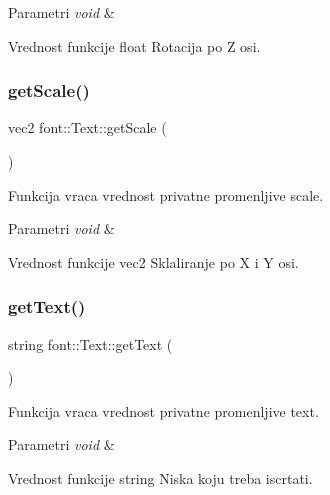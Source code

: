 \begin{DoxyParams}{Parametri}
{\em void} & \\
\hline
\end{DoxyParams}
\begin{DoxyReturn}{Vrednost funkcije}
float Rotacija po Z osi. 
\end{DoxyReturn}
\mbox{\label{classfont_1_1Text_af94e22a422e17028fef39e69b46736f3}} 
\subsubsection{\texorpdfstring{get\+Scale()}{getScale()}}
{\footnotesize\ttfamily vec2 font\+::\+Text\+::get\+Scale (\begin{DoxyParamCaption}{ }\end{DoxyParamCaption})}



Funkcija vraca vrednost privatne promenljive scale. 


\begin{DoxyParams}{Parametri}
{\em void} & \\
\hline
\end{DoxyParams}
\begin{DoxyReturn}{Vrednost funkcije}
vec2 Sklaliranje po X i Y osi. 
\end{DoxyReturn}
\mbox{\label{classfont_1_1Text_ae78670d785e8071d66298c84bcf89330}} 
\subsubsection{\texorpdfstring{get\+Text()}{getText()}}
{\footnotesize\ttfamily string font\+::\+Text\+::get\+Text (\begin{DoxyParamCaption}{ }\end{DoxyParamCaption})}



Funkcija vraca vrednost privatne promenljive text. 


\begin{DoxyParams}{Parametri}
{\em void} & \\
\hline
\end{DoxyParams}
\begin{DoxyReturn}{Vrednost funkcije}
string Niska koju treba iscrtati. 
\end{DoxyReturn}
\mbox{\label{classfont_1_1Text_a650c183619f7f2a41ef7cb9a50d04f05}} 
